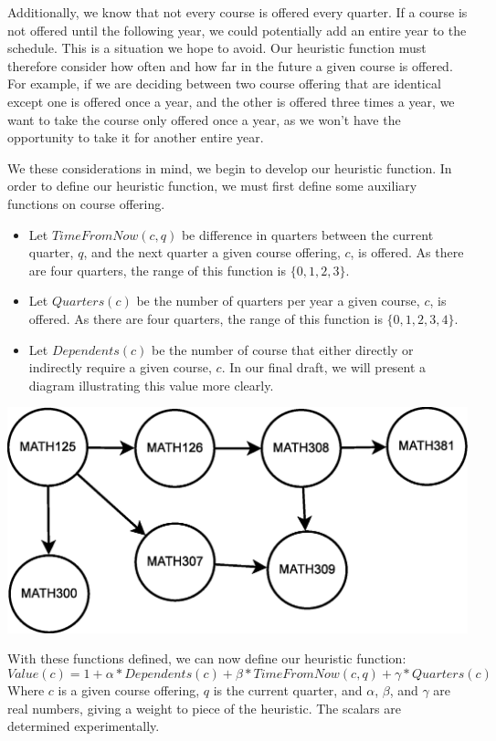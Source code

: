 \documentclass[11pt]{article} %
\begin{document}
Additionally, we know that not every course is offered every quarter. If
a course is not offered until the following year, we could potentially add an
entire year to the schedule. This is a situation we hope to avoid. Our heuristic
function must therefore consider how often and how far in the future a given
course is offered. For example, if we are deciding between two course offering
that are identical except one is offered once a year, and the other is offered
three times a year, we want to take the course only offered once a year, as we
won't have the opportunity to take it for another entire year.

We these considerations in mind, we begin to develop our heuristic function. In
order to define our heuristic function, we must first define some auxiliary
functions on course offering.  \begin{itemize} \item Let $TimeFromNow(c, q)$ be
difference in quarters between the current quarter, $q$, and the next quarter
a given course offering, $c$, is offered. As there are four quarters, the range
of this function is $\{0, 1, 2, 3\}$.  \item Let $Quarters(c)$ be the number of
quarters per year a given course, $c$, is offered. As there are four quarters,
the range of this function is $\{0, 1, 2, 3, 4\}$.  \item Let $Dependents(c)$ be
the number of course that either directly or indirectly require a given course,
$c$. In our final draft, we will present a diagram illustrating this value more
clearly.  \end{itemize}

\includegraphics{more_prereq_tree}

With these functions defined, we can now define our heuristic function:
\begin{equation} Value(c) = 1 + \alpha * Dependents(c) + \beta * TimeFromNow(c,
q) + \gamma * Quarters(c) \end{equation} Where $c$ is a given course offering,
$q$ is the current quarter, and $\alpha$, $\beta$, and $\gamma$ are real
numbers, giving a weight to piece of the heuristic. The scalars are determined
experimentally.
\end{document}
